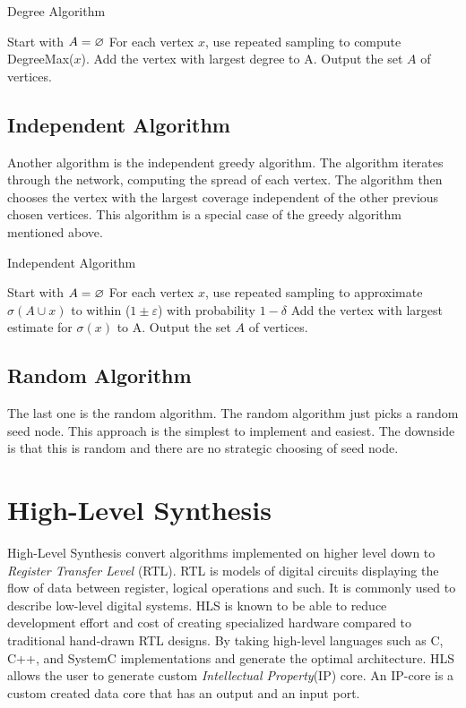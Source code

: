 \begin{algorithm}
\caption{Degree Algorithm}
\begin{algorithmic}[1]
\State Start with $A = \oldemptyset$
\State For each vertex $x$, use repeated sampling to compute DegreeMax($x$).
\State Add the vertex with largest degree to A.
\EndWhile
\State Output the set $A$ of vertices.
\end{algorithmic}
\end{algorithm}

\subsection{Independent Algorithm}
Another algorithm is the independent greedy algorithm. The algorithm iterates through the network, computing the spread of each vertex. The algorithm then chooses the vertex with the largest coverage independent of the other previous chosen vertices. This algorithm is a special case of the greedy algorithm mentioned above.

\begin{algorithm}
\caption{Independent Algorithm}
\begin{algorithmic}[1]
\State Start with $A = \oldemptyset$
\State For each vertex $x$, use repeated sampling to approximate $\sigma(A \cup {x}) $ to within ($1 \pm \varepsilon$) with probability
$1 − \delta$
\State Add the vertex with largest estimate for $\sigma({x})$ to A.
\EndWhile
\State Output the set $A$ of vertices.
\end{algorithmic}
\end{algorithm}



\subsection{Random Algorithm}
The last one is the random algorithm. The random algorithm just picks a random seed node. This approach is the simplest to implement and easiest. The downside is that this is random and there are no strategic choosing of seed node. 

 
 
\section{High-Level Synthesis}

High-Level Synthesis convert algorithms implemented on higher level down to \textit{Register Transfer Level} (RTL)\cite{HLSTutorial}. RTL is models of digital circuits displaying the flow of data between register, logical operations and such. It is commonly used to describe low-level digital systems. HLS is known to be able to reduce development effort and cost of creating specialized hardware compared to traditional hand-drawn RTL designs\cite{zhao2016improving}\cite{Zuo:2013:IHL:2435264.2435271}\cite{HLSTutorial}. By taking high-level languages such as C, C++, and SystemC implementations and generate the optimal architecture. HLS allows the user to generate custom \textit{Intellectual Property}(IP) core. An IP-core is a custom created data core that has an output and an input port.


